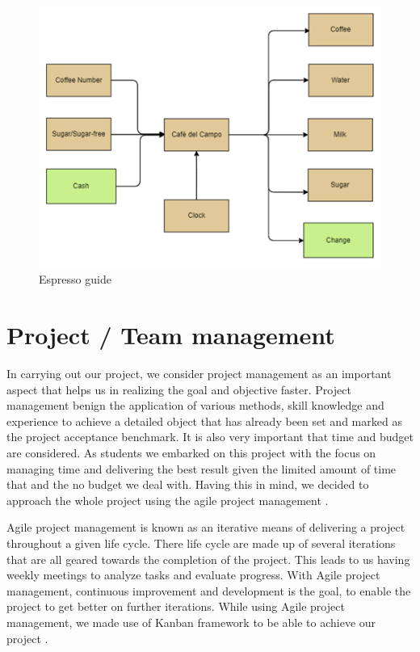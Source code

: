 \documentclass[12pt]{article}
\begin{document}
\begin{figure}[h]
\includegraphics[scale=1.1]{imgs/blockd.png}
\caption{Espresso guide}
\label{fig:block}
\end{figure}

\section{Project / Team management}

In carrying out our project, we consider project management as an important aspect that helps us in realizing the goal and objective faster. Project management benign the application of various methods, skill knowledge and experience to achieve a detailed object that has already been set and marked as the project acceptance benchmark. It is also very important that time and budget are considered. As students we embarked on this project with the focus on managing time and delivering the best result given the limited amount of time that and the no budget we deal with.  Having this in mind, we decided to approach the whole project using the agile project management \cite{APM1}. 

Agile project management is known as an iterative means of delivering a project throughout a given life cycle. There life cycle are made up of several iterations that are all geared towards the completion of the project. This leads to us having weekly meetings to analyze tasks and evaluate progress. With Agile project management, continuous improvement and development is the goal, to enable the project to get better on further iterations. While using Agile project management, we made use of Kanban framework to be able to achieve our project \cite{APM}. 
\end{document}
